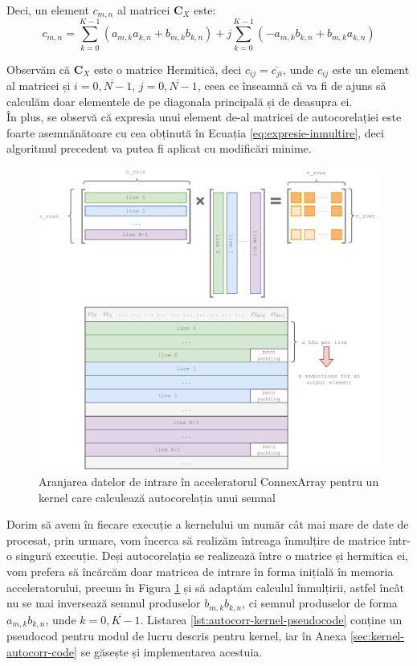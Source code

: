 Deci, un element $c_{m, n}$ al matricei $\bm{C}_X$ este:
\begin{equation}
c_{m, n} = \displaystyle{
           \sum_{k=0}^{K-1} (a_{m,k}a_{k,n} + b_{m,k}b_{k,n}) + 
          j\sum_{k=0}^{K-1} (-a_{m,k}b_{k,n} + b_{m,k}a_{k,n})}
\end{equation}

Observăm că $\bm{C}_X$ este o matrice Hermitică, deci $c_{ij} =
\overline{c_{ji}}$, unde $c_{ij}$ este un element al matricei și  $i =
\overline{0, N-1}$, $j = \overline{0, N-1}$, ceea ce înseamnă că va fi de ajuns
să calculăm doar elementele de pe diagonala principală și de deasupra ei. \\

În plus, se observă că expresia unui element de-al matricei de autocorelației
este foarte asemnănătoare cu cea obținută în Ecuația
\eqref{eq:expresie-inmultire}, deci algoritmul precedent va putea fi aplicat cu
modificări minime. \\

\begin{figure}[h]
    \centering
    \includegraphics[width=1\textwidth]{src/img/autocorrelation}
    \caption{Aranjarea datelor de intrare în acceleratorul ConnexArray pentru un
    kernel care calculează autocorelația unui semnal}
    \label{fig:autocorrelation-in-ls}
\end{figure}

Dorim să avem în fiecare execuție a kernelului un număr cât mai mare de date de
procesat, prin urmare, vom încerca să realizăm întreaga înmulțire de matrice
într-o singură execuție. Deși autocorelația se realizează între o matrice și
hermitica ei, vom prefera să încărcăm doar matricea de intrare în forma inițială
în memoria acceleratorului, precum în Figura \ref{fig:autocorrelation-in-ls} și
să adaptăm calculul înmulțirii, astfel încât nu se mai inversează semnul
produselor $b_{m,k}b_{k,n}$, ci semnul produselor de forma $a_{m,k}b_{k,n}$,
unde $k = \overline{0, K-1}$. Listarea \ref{lst:autocorr-kernel-pseudocode}
conține un pseudocod pentru modul de lucru descris pentru kernel, iar în
Anexa \ref{sec:kernel-autocorr-code} se găsește și implementarea acestuia.\\ 

